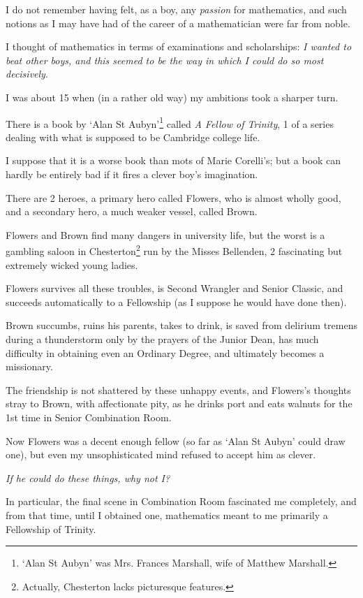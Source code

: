 \documentclass{article}
\numberwithin{equation}{section}
\begin{document}
I do not remember having felt, as a boy, any \textit{passion} for mathematics, and such notions as I may have had of the career of a mathematician were far from noble.

I thought of mathematics in terms of examinations and scholarships: \textit{I wanted to beat other boys, and this seemed to be the way in which I could do so most decisively}.

%
I was about 15 when (in a rather old way) my ambitions took a sharper turn.

There is a book by `Alan St Aubyn'\footnote{`Alan St Aubyn' was Mrs. Frances Marshall, wife of Matthew Marshall.} called \textit{A Fellow of Trinity}, 1 of a series dealing with what is supposed to be Cambridge college life.

I suppose that it is a worse book than mots of Marie Corelli's; but a book can hardly be entirely bad if it fires a clever boy's imagination.

There are 2 heroes, a primary hero called Flowers, who is almost wholly good, and a secondary hero, a much weaker vessel, called Brown.

Flowers and Brown find many dangers in university life, but the worst is a gambling saloon in Chesterton\footnote{Actually, Chesterton lacks picturesque features.} run by the Misses Bellenden, 2 fascinating but extremely wicked young ladies.

Flowers survives all these troubles, is Second Wrangler and Senior Classic, and succeeds automatically to a Fellowship (as I suppose he would have done then).

Brown succumbs, ruins his parents, takes to drink, is saved from delirium tremens during a thunderstorm only by the prayers of the Junior Dean, has much difficulty in obtaining even an Ordinary Degree, and ultimately becomes a missionary.

The friendship is not shattered by these unhappy events, and Flowers's thoughts stray to Brown, with affectionate pity, as he drinks port and eats walnuts for the 1st time in Senior Combination Room.

%
Now Flowers was a decent enough fellow (so far as `Alan St Aubyn' could draw one), but even my unsophisticated mind refused to accept him as clever.

\textit{If he could do these things, why not I?}

In particular, the final scene in Combination Room fascinated me completely, and from that time, until I obtained one, mathematics meant to me primarily a Fellowship of Trinity.
\end{document}
